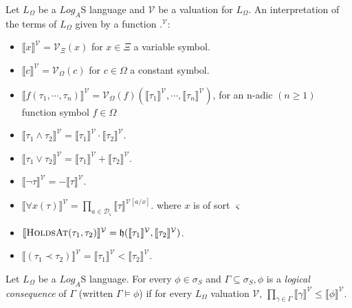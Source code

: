 \begin{defn}
	Let $L_{\Omega}$ be a $Log_A$S language and $\mathcal{V}$ be a valuation for $L_{\Omega}$. An interpretation of the terms of $L_{\Omega}$ given by a function
	\textlbrackdbl .\textrbrackdbl$^{\mathcal{V}}$:
\end{defn}
\begin{itemize}
	\item $\llbracket x \rrbracket^{\mathcal{V}} = \mathcal{V}_{\Xi}(x)$ for $x \in \Xi$ a variable symbol.
	\item $\llbracket c \rrbracket^{\mathcal{V}} = \mathcal{V}_{\Omega}(c)$ for $c \in \Omega$ a constant symbol.
	\item $\llbracket f(\tau_1, \cdots, \tau_n) \rrbracket^{\mathcal{V}} = \mathcal{V}_{\Omega}(f)(\llbracket \tau_1 \rrbracket^{\mathcal{V}}, \cdots, \llbracket\tau_n \rrbracket^{\mathcal{V}})$,
	      for an n-adic $(n \geq 1)$ function symbol $f \in \Omega$
	\item $\llbracket \tau_1 \land \tau_2 \rrbracket^{\mathcal{V}} = \llbracket \tau_1 \rrbracket^{\mathcal{V}} \cdot \llbracket \tau_2 \rrbracket^{\mathcal{V}}$.
	\item $\llbracket \tau_1 \lor \tau_2 \rrbracket^{\mathcal{V}} = \llbracket \tau_1 \rrbracket^{\mathcal{V}} + \llbracket \tau_2 \rrbracket^{\mathcal{V}}$.
	\item $\llbracket \neg \tau \rrbracket^{\mathcal{V}} = - \llbracket \tau \rrbracket^{\mathcal{V}}$.
	\item $\llbracket \forall x(\tau) \rrbracket^{\mathcal{V}} = \prod_{a \in \mathcal{D}_{\varsigma}} \llbracket \tau \rrbracket^{\mathcal{V}[a/x]}$. where $x$ is of sort $\varsigma$
	\item $\llbracket \textsc{HoldsAt}(\tau_1, \tau_2)\rrbracket^{\mathcal{V}} = \mathfrak{h}(\llbracket \tau_1 \rrbracket^{\mathcal{V}}, \llbracket \tau_2 \rrbracket^{\mathcal{V}})$.
	\item $\llbracket (\tau_1 \prec \tau_2) \rrbracket^{\mathcal{V}} = \llbracket \tau_1 \rrbracket^{\mathcal{V}} < \llbracket \tau_2 \rrbracket^{\mathcal{V}}$.
\end{itemize}

\begin{defn}
	Let $L_{\Omega}$ be a $Log_A$S language.
	For every $\phi \in \sigma_S$ and $\Gamma \subseteq \sigma_S, \phi$ is a \textit{logical consequence} of $\Gamma$ (written $\Gamma \models \phi$) if for every $L_{\Omega}$ valuation $\mathcal{V}$,
	$\displaystyle \prod_{\gamma \in \Gamma} \llbracket \gamma \rrbracket^{\mathcal{V}} \leq \llbracket \phi \rrbracket^{\mathcal{V}}$.

\end{defn}

